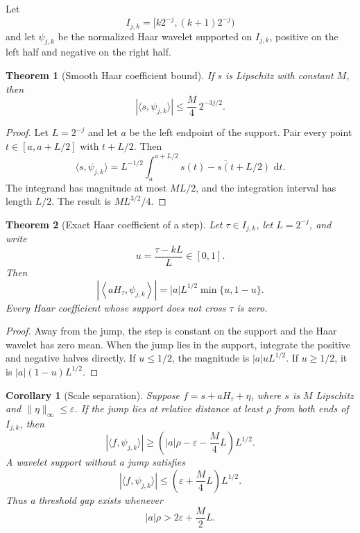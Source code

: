 \documentclass{aomart}
\newtheorem{theorem}{Theorem}[section]
\newtheorem{corollary}[corollary]{Corollary}
\theoremstyle{definition}
\theoremstyle{remark}
\newcommand{\dd}{\,\mathrm d}
\begin{document}
Let
\[
I_{j,k}
=
[k2^{-j},(k+1)2^{-j})
\]
and let \(\psi_{j,k}\) be the normalized Haar wavelet supported on \(I_{j,k}\), positive on the left half and negative on the right half.

\begin{theorem}[Smooth Haar coefficient bound]\label{thm:smooth_haar_bound}
If \(s\) is Lipschitz with constant \(M\), then
\[
|\langle s,\psi_{j,k}\rangle|
\leq
\frac M4\,2^{-3j/2}.
\]
\end{theorem}

\begin{proof}
Let \(L=2^{-j}\) and let \(a\) be the left endpoint of the support. Pair every point \(t\in[a,a+L/2]\) with \(t+L/2\). Then
\[
\langle s,\psi_{j,k}\rangle
=
L^{-1/2}
\int_a^{a+L/2}
\overline{s(t)-s(t+L/2)}\,\dd t.
\]
The integrand has magnitude at most \(ML/2\), and the integration interval has length \(L/2\). The result is \(ML^{3/2}/4\).
\end{proof}

\begin{theorem}[Exact Haar coefficient of a step]\label{thm:haar_step_coefficient}
Let \(\tau\in I_{j,k}\), let \(L=2^{-j}\), and write
\[
u=\frac{\tau-kL}{L}\in[0,1].
\]
Then
\[
\left|
\left\langle
 aH_\tau,\psi_{j,k}
\right\rangle
\right|
=
|a|L^{1/2}\min\{u,1-u\}.
\]
Every Haar coefficient whose support does not cross \(\tau\) is zero.
\end{theorem}

\begin{proof}
Away from the jump, the step is constant on the support and the Haar wavelet has zero mean. When the jump lies in the support, integrate the positive and negative halves directly. If \(u\leq1/2\), the magnitude is \(|a|uL^{1/2}\). If \(u\geq1/2\), it is \(|a|(1-u)L^{1/2}\).
\end{proof}

\begin{corollary}[Scale separation]\label{cor:haar_scale_separation}
Suppose \(f=s+aH_\tau+\eta\), where \(s\) is \(M\) Lipschitz and \(\|\eta\|_\infty\leq\varepsilon\). If the jump lies at relative distance at least \(\rho\) from both ends of \(I_{j,k}\), then
\[
|\langle f,\psi_{j,k}\rangle|
\geq
\left(
|a|\rho
-\varepsilon
-\frac M4L
\right)L^{1/2}.
\]
A wavelet support without a jump satisfies
\[
|\langle f,\psi_{j,k}\rangle|
\leq
\left(
\varepsilon+\frac M4L
\right)L^{1/2}.
\]
Thus a threshold gap exists whenever
\[
|a|\rho
>
2\varepsilon+\frac M2L.
\]
\end{corollary}
\end{document}
